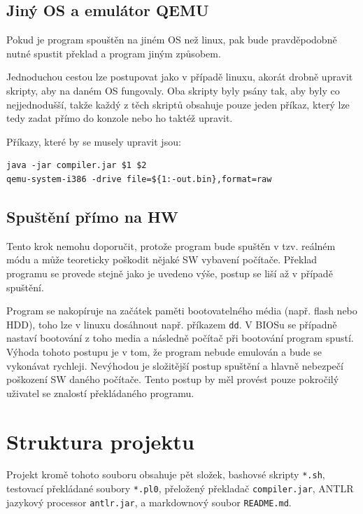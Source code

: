 \documentclass[a4paper]{article}
\begin{document}
\subsection{Jin\'y OS a emul\'ator QEMU}
Pokud je program spou\v{s}t\v{e}n na jin\'em OS ne\v{z} linux, pak bude
pravd\v{e}podobn\v{e} nutn\'e spustit p\v{r}eklad a program jin\'ym
zp\r{u}sobem.

Jednoduchou cestou lze postupovat jako v p\v{r}\'ipad\v{e} linuxu, akor\'at
drobn\v{e} upravit skripty, aby na dan\'em OS fungovaly. Oba skripty byly
ps\'any tak, aby byly co nejjednodu\v{s}\v{s}\'i, tak\v{z}e ka\v{z}d\'y
z t\v{e}ch skript\r{u} obsahuje pouze jeden p\v{r}\'ikaz, kter\'y lze
tedy zadat p\v{r}\'imo do konzole nebo ho takt\'e\v{z} upravit.

P\v{r}\'ikazy, kter\'e by se musely upravit jsou:
\begin{verbatim}
java -jar compiler.jar $1 $2 
qemu-system-i386 -drive file=${1:-out.bin},format=raw
\end{verbatim}
\subsection{Spu\v{s}t\v{e}n\'i p\v{r}\'imo na HW}
Tento krok nemohu doporu\v{c}it, proto\v{z}e program bude spu\v{s}t\v{e}n
v tzv. re\'aln\'em m\'odu a m\r{u}\v{z}e teoreticky po\v{s}kodit
n\v{e}jak\'e SW vybaven\'i po\v{c}\'ita\v{c}e. P\v{r}eklad programu se
provede stejn\v{e} jako je uvedeno v\'y\v{s}e, postup se li\v{s}\'i a\v{z}
v p\v{r}\'ipad\v{e} spu\v{s}t\v{e}n\'i.

Program se nakop\'iruje na za\v{c}\'atek
pam\v{e}ti bootovateln\'eho m\'edia (nap\v{r}. flash nebo HDD), toho
lze v linuxu dos\'ahnout nap\v{r}. p\v{r}\'ikazem \texttt{dd}. V BIOSu se
p\v{r}\'ipad\-n\v{e} nastav\'i bootov\'an\'i z toho media a n\'asledn\v{e}
po\v{c}\'ita\v{c} p\v{r}i bootov\'an\'i program spust\'i. V\'yhoda tohoto
postupu je v tom, \v{z}e program nebude emulov\'an a bude se vykon\'avat
rychleji. Nev\'yhodou je slo\v{z}it\v{e}j\v{s}\'i postup spu\v{s}t\v{e}n\'i a
hlavn\v{e} nebezpe\v{c}\'i po\v{s}kozen\'i SW dan\'eho po\v{c}\'ita\v{c}e.
Tento postup by m\v{e}l prov\'est pouze pokro\v{c}il\'y u\v{z}ivatel se
znalost\'i p\v{r}ekl\'adan\'eho programu.
\clearpage
\section{Struktura projektu}
Projekt krom\v{e} tohoto souboru obsahuje p\v{e}t slo\v{z}ek, bashovs\'e
skripty \texttt{*.sh},
testovac\'i p\v{r}ekl\'adan\'e soubory \texttt{*.pl0}, p\v{r}elo\v{z}en\'y
p\v{r}eklada\v{c} \texttt{compiler.jar},
ANTLR jazykov\'y processor \texttt{antlr.jar}, a markdownov\'y soubor
\texttt{README.md}.
\end{document}
